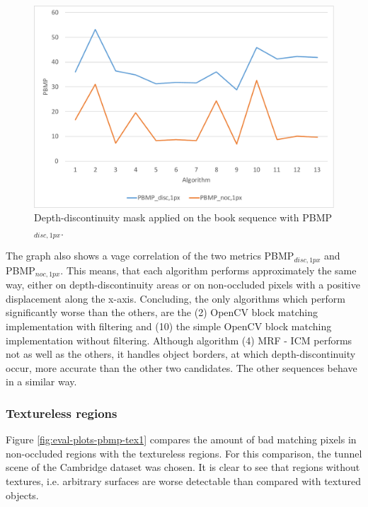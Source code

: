 \begin{figure}[h!]
\centering
\includegraphics[width=1.0\textwidth]{src/images/evaluation/plots/01-book-pbmp-disc-1.pdf}
\caption[Chart of depth-discontinuity mask]{Depth-discontinuity mask applied on the book sequence with PBMP$_{disc,1px}$.}
\label{fig:eval-plots-pbmp-disc1}
\end{figure}

\noindent The graph also shows a vage correlation of the two metrics PBMP$_{disc,1px}$ and PBMP$_{noc,1px}$.
This means, that each algorithm performs approximately the same way, either on depth-discontinuity areas or on non-occluded pixels with a positive displacement along the x-axis.
Concluding, the only algorithms which perform significantly worse than the others, are the (2) OpenCV block matching implementation with filtering and (10) the simple OpenCV block matching implementation without filtering.
Although algorithm (4) MRF - ICM performs not as well as the others, it handles object borders, at which depth-discontinuity occur, more accurate than the other two candidates.
The other sequences behave in a similar way.

\subsubsection{Textureless regions}

\noindent Figure \ref{fig:eval-plots-pbmp-tex1} compares the amount of bad matching pixels in non-occluded regions with the textureless regions.
For this comparison, the tunnel scene of the Cambridge dataset was chosen.
It is clear to see that regions without textures, i.e. arbitrary surfaces are worse detectable than compared with textured objects.

